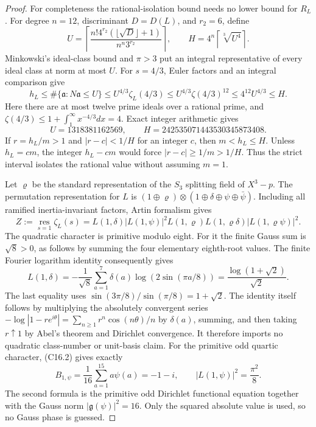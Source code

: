 \begin{proof}
For completeness the rational-isolation bound needs no lower
bound for $R_L$.  For degree $n=12$, discriminant $D=D(L)$,
and $r_2=6$, define
\[
 U=\left\lceil\frac{n!4^{r_2}(\lfloor\sqrt D\rfloor+1)}
                              {n^n3^{r_2}}\right\rceil,
 \qquad H=4^n\left\lceil\sqrt[3]{U^4}\right\rceil.
 \tag{C16.14}
\]
Minkowski's ideal-class bound and $\pi>3$ put an integral
representative of every ideal class at norm at most $U$.
For $s=4/3$, Euler factors and an integral comparison give
\[
 h_L\le\#\{\mathfrak a:N\mathfrak a\le U\}
 \le U^{4/3}\zeta_L(4/3)
 \le U^{4/3}\zeta(4/3)^{12}\le4^{12}U^{4/3}\le H.
 \tag{C16.15}
\]
Here there are at most twelve prime ideals over a rational prime,
and $\zeta(4/3)\le1+\int_1^\infty x^{-4/3}dx=4$.
Exact integer arithmetic gives
\[
 U=1318381162569,\qquad H=242535071443530345873408.
 \tag{C16.16}
\]
If $r=h_L/m>1$ and $|r-c|<1/H$ for an integer $c$, then
$m<h_L\le H$.  Unless $h_L=cm$, the integer $h_L-cm$ would
force $|r-c|\ge1/m>1/H$.  Thus the strict interval isolates the
rational value without assuming $m=1$.

Let $\varrho$ be the standard representation of the $S_3$ splitting
field of $X^3-p$.  The permutation representation for $L$ is
$(1\oplus\varrho)\otimes(1\oplus\delta\oplus\psi\oplus\bar\psi)$.
Including all ramified inertia-invariant factors, Artin formalism gives
\[
 Z:=\operatorname*{res}_{s=1}\zeta_L(s)
 =L(1,\delta)|L(1,\psi)|^2
       L(1,\varrho)L(1,\varrho\delta)|L(1,\varrho\psi)|^2.
 \tag{C16.17}
\]
The quadratic character is primitive modulo eight.
For it the finite Gauss sum is $\sqrt8>0$, as follows by
summing the four elementary eighth-root values.  The finite
Fourier logarithm identity consequently gives
\[
 L(1,\delta)=-\frac1{\sqrt8}\sum_{a=1}^7\delta(a)
          \log(2\sin(\pi a/8))
       =\frac{\log(1+\sqrt2)}{\sqrt2}.
 \tag{C16.18}
\]
The last equality uses $\sin(3\pi/8)/\sin(\pi/8)=1+\sqrt2$.
The identity itself follows by multiplying the absolutely
convergent series $-\log|1-re^{i\theta}|=\sum_{n\ge1}
 r^n\cos(n\theta)/n$ by $\delta(a)$, summing, and then taking
$r\uparrow1$ by Abel's theorem and Dirichlet convergence.
It therefore imports no quadratic class-number or unit-basis claim.
For the primitive odd quartic character, (C16.2) gives exactly
\[
 B_{1,\psi}=\frac1{16}\sum_{a=1}^{15}a\psi(a)=-1-i,
       \qquad |L(1,\psi)|^2=\frac{\pi^2}{8}.
 \tag{C16.19}
\]
The second formula is the primitive odd Dirichlet functional
equation together with the Gauss norm $|\mathfrak g(\psi)|^2=16$.
Only the squared absolute value is used, so no Gauss phase is guessed.


\end{proof}

